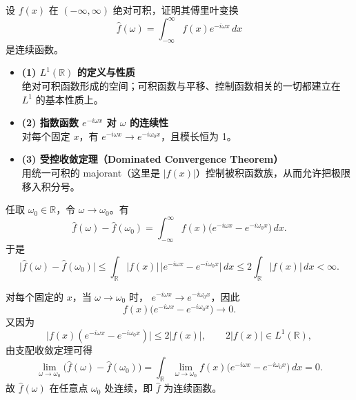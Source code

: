 \begin{homework}[2]
设 $f(x)$ 在 $(-\infty,\infty)$ 绝对可积，证明其傅里叶变换
\[
\hat f(\omega)=\int_{-\infty}^{\infty}f(x)e^{-i\omega x}\,dx
\]
是连续函数。
\end{homework}
\begin{dxtips}
    \begin{itemize}
  \item \textbf{(1) $L^1(\mathbb R)$ 的定义与性质}\\
  绝对可积函数形成的空间；可积函数与平移、控制函数相关的一切都建立在 $L^1$ 的基本性质上。

  \item \textbf{(2) 指数函数 $e^{-i\omega x}$ 对 $\omega$ 的连续性}\\
  对每个固定 $x$，有 $e^{-i\omega x}\to e^{-i\omega_0 x}$，且模长恒为 1。

  \item \textbf{(3) 受控收敛定理（Dominated Convergence Theorem）}\\
  用统一可积的 majorant（这里是 $|f(x)|$）控制被积函数族，从而允许把极限移入积分号。
\end{itemize}
\end{dxtips}
\begin{solution}
任取 $\omega_0\in\mathbb R$，令 $\omega\to\omega_0$。有
\[
\hat f(\omega)-\hat f(\omega_0)
=\int_{-\infty}^{\infty}
  f(x)\bigl(e^{-i\omega x}-e^{-i\omega_0 x}\bigr)\,dx .
\]
于是
\[
\bigl|\hat f(\omega)-\hat f(\omega_0)\bigr|
\le\int_{\mathbb R}|f(x)|\,
   \bigl|e^{-i\omega x}-e^{-i\omega_0 x}\bigr|\,dx
\le 2\int_{\mathbb R}|f(x)|\,dx<\infty.
\]

对每个固定的 $x$，当 $\omega\to\omega_0$ 时，
$e^{-i\omega x}\to e^{-i\omega_0 x}$，因此
\[
f(x)\bigl(e^{-i\omega x}-e^{-i\omega_0 x}\bigr)
\to 0 .
\]
又因为
\[
\bigl|f(x)(e^{-i\omega x}-e^{-i\omega_0 x})\bigr|
\le 2|f(x)|,\qquad 2|f(x)|\in L^1(\mathbb R),
\]
由支配收敛定理可得
\[
\lim_{\omega\to\omega_0}
\bigl(\hat f(\omega)-\hat f(\omega_0)\bigr)
=\int_{\mathbb R}
  \lim_{\omega\to\omega_0}
  f(x)\bigl(e^{-i\omega x}-e^{-i\omega_0 x}\bigr)\,dx
=0.
\]
故 $\hat f(\omega)$ 在任意点 $\omega_0$ 处连续，即 $\hat f$ 为连续函数。
\end{solution}

